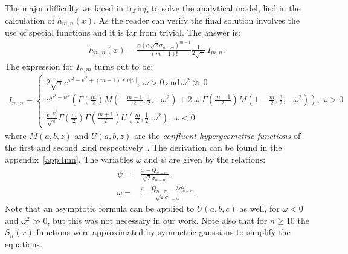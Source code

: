 \documentclass[preprint,12pt]{elsarticle}
\begin{document}
The major difficulty we faced in trying to solve the analytical model, lied in the calculation of $h_{m,n}(x)$. 
As the reader can verify the final solution involves the use of special functions and it is far from trivial. 
The answer is:
\begin{align}
h_{m,n}(x) =  \frac{\alpha (\alpha\sqrt{2} \sigma_{n-m})^{m-1}}{(m-1)!} \frac{1}{2\sqrt{\pi}} \  I_{m,n}.
\end{align}  
The expression for $I_{n,m}$ turns out to be:
\begin{align}
I_{m,n} = 
\begin{cases}
2\sqrt{\pi}   e^{\omega^2 - \psi^2 + (m-1) \ell n |\omega|}, \ \omega>0 \ \text{and} \  \omega^2 \gg 0\\
e^{\omega^2 -\psi^2 } \left( \Gamma\left( \frac{m}{2} \right) M\left(-\frac{m-1}{2}, \frac{1}{2}, -\omega^2 \right)  
+ 2|\omega| \Gamma\left( \frac{m+1}{2} \right) M\left(1-\frac{m}{2}, \frac{3}{2}, -\omega^2 \right)       \right), \ \omega > 0  \\
\frac{ e^{ -\psi^2 } }{\sqrt{\pi}}   \Gamma\left( \frac{m}{2} \right)   \Gamma\left( \frac{m+1}{2} \right) U\left( \frac{m}{2}, \frac{1}{2}, \omega^2  \right), \ \omega<0
\end{cases}
\nonumber
\end{align} 
where $M(a,b,z)$ and $U(a,b,z)$ are the \emph{confluent hypergeometric functions} of the first and second kind respectively~\cite{error}. 
The derivation can be found in the appendix~\ref{app:Imn}. 
The variables $\omega$ and $\psi$ are given by the relations:
\begin{align}
\psi = & \frac{x-Q_{n-m}}{\sqrt{2}\sigma_{n-m}}, \\
\omega = & \frac{x-Q_{n-m} -\lambda\sigma^2_{n-m}}{\sqrt{2}\sigma_{n-m}}.
\end{align}  
Note that an asymptotic formula can be applied to $U(a,b,c)$ as well, for $\omega < 0$ and $\omega^2 \gg 0$, but this was not necessary in our work. 
Note also that for $n\geq10$ the $S_n(x)$ functions were approximated by symmetric gaussians to simplify the equations. 
\end{document}
